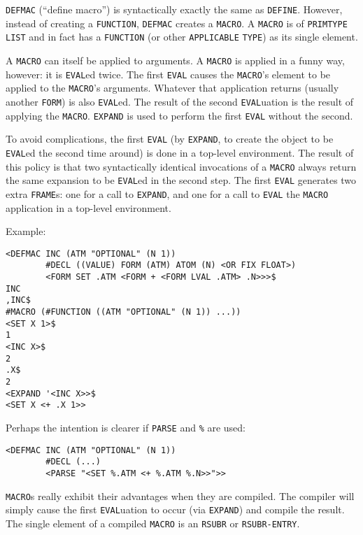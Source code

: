 \documentclass[a4paper,]{article}
\begin{document}
 \texttt{DEFMAC} (``define macro'') is syntactically exactly the same as \texttt{DEFINE}.
However, instead of creating a \texttt{FUNCTION}, \texttt{DEFMAC} creates a \texttt{MACRO}. A
\texttt{MACRO} is of \texttt{PRIMTYPE} \texttt{LIST} and in fact has a \texttt{FUNCTION} (or other \texttt{APPLICABLE}
\texttt{TYPE}) as its single element.

A \texttt{MACRO} can itself be applied to arguments. A \texttt{MACRO} is applied in a funny way, however: it is
\texttt{EVAL}ed twice. The first \texttt{EVAL} causes the \texttt{MACRO}'s element to be applied to the \texttt{MACRO}'s
arguments. Whatever that application returns (usually another \texttt{FORM}) is also \texttt{EVAL}ed. The result of the
second \texttt{EVAL}uation is the result of applying the \texttt{MACRO}. \texttt{EXPAND} is
used to perform the first \texttt{EVAL} without the second.

To avoid complications, the first \texttt{EVAL} (by \texttt{EXPAND}, to create the object to be \texttt{EVAL}ed the second
time around) is done in a top-level environment. The result of this policy is that two syntactically identical invocations
of a \texttt{MACRO} always return the same expansion to be \texttt{EVAL}ed in the second step. The first \texttt{EVAL}
generates two extra \texttt{FRAME}s: one for a call to \texttt{EXPAND}, and one for a call to \texttt{EVAL} the
\texttt{MACRO} application in a top-level environment.

Example:

\begin{verbatim}
<DEFMAC INC (ATM "OPTIONAL" (N 1))
        #DECL ((VALUE) FORM (ATM) ATOM (N) <OR FIX FLOAT>)
        <FORM SET .ATM <FORM + <FORM LVAL .ATM> .N>>>$
INC
,INC$
#MACRO (#FUNCTION ((ATM "OPTIONAL" (N 1)) ...))
<SET X 1>$
1
<INC X>$
2
.X$
2
<EXPAND '<INC X>>$
<SET X <+ .X 1>>
\end{verbatim}

Perhaps the intention is clearer if \texttt{PARSE} and \texttt{\%} are used:

\begin{verbatim}
<DEFMAC INC (ATM "OPTIONAL" (N 1))
        #DECL (...)
        <PARSE "<SET %.ATM <+ %.ATM %.N>>">>
\end{verbatim}

\texttt{MACRO}s really exhibit their advantages when they are compiled. The compiler will simply cause the first
\texttt{EVAL}uation to occur (via \texttt{EXPAND}) and compile the result. The single element of a compiled \texttt{MACRO}
is an \texttt{RSUBR} or \texttt{RSUBR-ENTRY}.
\end{document}
